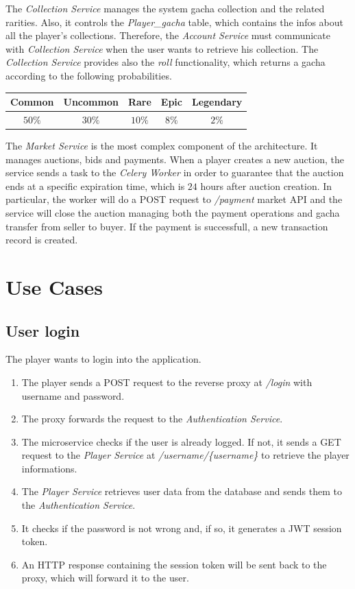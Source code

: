 \documentclass{article}
\begin{document}
The \emph{Collection Service} manages the system gacha collection and the related rarities. Also, it controls the \emph{Player\_gacha} table, which contains the infos about all the player's collections. Therefore, the \emph{Account Service} must communicate with \emph{Collection Service} when the user wants to retrieve his collection. The \emph{Collection Service} provides also the \emph{roll} functionality, which returns a gacha according to the following probabilities.

\begin{table}[ht!]
    \centering
    \begin{tabular}{|c|c|c|c|c|}
        \hline
        \textbf{Common} & \textbf{Uncommon} & \textbf{Rare} & \textbf{Epic} & \textbf{Legendary} \\
        \hline
        $50\%$          & $30\%$            & $10\%$        & $8\%$         & $2\%$              \\
        \hline
    \end{tabular}
\end{table}

The \emph{Market Service} is the most complex component of the architecture. It manages auctions, bids and payments. When a player creates a new auction, the service sends a task to the \emph{Celery Worker} in order to guarantee that the auction ends at a specific expiration time, which is $24$ hours after auction creation. In particular, the worker will do a POST request to \emph{/payment} market API and the service will close the auction managing both the payment operations and gacha transfer from seller to buyer. If the payment is successfull, a new transaction record is created.

\section{Use Cases}
\subsection{User login}
The player wants to login into the application.
\begin{enumerate}
    \item The player sends a POST request to the reverse proxy at \emph{/login} with username and password.
    \item The proxy forwards the request to the \emph{Authentication Service}.
    \item The microservice checks if the user is already logged. If not, it sends a GET request to the \emph{Player Service} at \emph{/username/\{username\}} to retrieve the player informations.
    \item The \emph{Player Service} retrieves user data from the database and sends them to the \emph{Authentication Service}.
    \item It checks if the password is not wrong and, if so, it generates a JWT session token.
    \item An HTTP response containing the session token will be sent back to the proxy, which will forward it to the user.
\end{enumerate}
\end{document}
